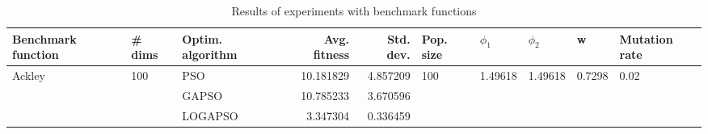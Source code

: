 \begin{table}
\centering
\caption{Results of experiments with benchmark functions}
\begin{tabular}{lllrrlllll}
\toprule
     Benchmark function &              \# dims & Optim. algorithm &  Avg. fitness &  Std. dev. &            Pop. size &               $\phi_{1}$ &               $\phi_{2}$ &                       w &         Mutation rate \\
\midrule
\multirow{3}{*}{Ackley} & \multirow{3}{*}{100} &              PSO &     10.181829 &   4.857209 & \multirow{3}{*}{100} & \multirow{3}{*}{1.49618} & \multirow{3}{*}{1.49618} & \multirow{3}{*}{0.7298} & \multirow{3}{*}{0.02} \\
                        &                      &            GAPSO &     10.785233 &   3.670596 &                      &                          &                          &                         &                       \\
                        &                      &          LOGAPSO &      3.347304 &   0.336459 &                      &                          &                          &                         &                       \\
\bottomrule
\end{tabular}
\end{table}
